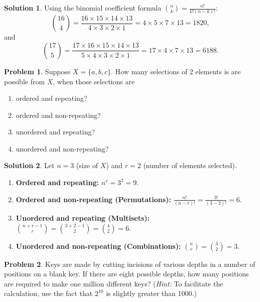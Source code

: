 \documentclass[12pt,a4paper]{article}
\numberwithin{equation}{section}
\theoremstyle{plain}
\theoremstyle{definition}
\newtheorem{problem}{Problem}
\theoremstyle{solutionstyle}
\newtheorem*{solution*}{Solution} %
\theoremstyle{definition} %
\begin{document}
	\begin{solution*}
		Using the binomial coefficient formula $\binom{n}{k} = \frac{n!}{k!(n-k)!}$:
		\[
		\binom{16}4 = \frac{16 \times 15 \times 14 \times 13}{4 \times 3 \times 2 \times 1} = 4 \times 5 \times 7 \times 13 = \boxed{1820},
		\]
		and 
		\[
		\binom{17}5 = \frac{17 \times 16 \times 15 \times 14 \times 13}{5 \times 4 \times 3 \times 2 \times 1} = 17 \times 4 \times 7 \times 13 = \boxed{6188.}
		\]
	\end{solution*}
	
	\begin{problem}
		Suppose $X = \{a,b,c\}$. How many selections of 2 elements is are possible from $X$, when those selections are
		\begin{enumerate}[label=(\alph*)]
			\item ordered and repeating? 
			\item ordered and non-repeating?
			\item unordered and repeating? 
			\item unordered and non-repeating? 
		\end{enumerate}
	\end{problem}
	
	\begin{solution*}
		Let $n=3$ (size of $X$) and $r=2$ (number of elements selected).
		\begin{enumerate}[label=(\alph*)]
			\item \textbf{Ordered and repeating:} $n^r = 3^2 = \boxed 9$. 
			\item \textbf{Ordered and non-repeating (Permutations):} $\frac{n!}{(n-r)!} = \frac{3!}{(3-2)!} = 6$.
			\item \textbf{Unordered and repeating (Multisets):} $\binom{n+r-1}{r} = \binom{3+2-1}{2} = \binom 4 2 = \boxed{6}$. 
			\item \textbf{Unordered and non-repeating (Combinations):} $\binom{n}{r} = \binom{3}{2} = \boxed 3$. 
		\end{enumerate}
	\end{solution*}
	
	\begin{problem}
		Keys are made by cutting incisions of various depths in a number of positions on a blank key. If there are eight possible depths, how many positions are required to make one million different keys? (\emph{Hint:} To facilitate the calculation, use the fact that $2^{10}$ is slightly greater than 1000.) 
	\end{problem}
	
\end{document}
